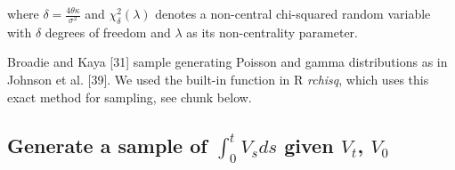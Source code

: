 \documentclass[12pt,twoside]{reedthesis}
\theoremstyle{definition}
\theoremstyle{definition}
\theoremstyle{remark}
\begin{document}
  where \(\delta = \frac{4 \theta \kappa}{\sigma^2}\) and
  \(\chi_{\delta}^{2}(\lambda)\) denotes a non-central chi-squared random
  variable with \(\delta\) degrees of freedom and \(\lambda\) as its
  non-centrality parameter.
  
  Broadie and Kaya {[}31{]} sample generating Poisson and gamma
  distributions as in Johnson et al. {[}39{]}. We used the built-in
  function in R \emph{rchisq}, which uses this exact method for sampling,
  see chunk below.
  \begin{Shaded}
  \begin{Highlighting}[]
  \StringTok{ }\NormalTok{(} \OperatorTok{*}\StringTok{ }\OperatorTok{*}\StringTok{ }\OperatorTok{/}\OperatorTok{^}
  \StringTok{ }\OperatorTok{^} \OperatorTok{*}\StringTok{ }\NormalTok{(} \OperatorTok{-}\StringTok{ }\NormalTok{(}\OperatorTok{-}\OperatorTok{*}\OperatorTok{/}\NormalTok{(}\OperatorTok{*}
  \StringTok{ }\OperatorTok{-}
  
  \StringTok{ }\NormalTok{(}\OperatorTok{*}\OperatorTok{*}\NormalTok{(}\OperatorTok{-}\OperatorTok{*}\OperatorTok{*}\OperatorTok{/}\OperatorTok{^} \OperatorTok{*}\StringTok{ }\NormalTok{(}\OperatorTok{-}\NormalTok{(}\OperatorTok{-}\OperatorTok{*}
  \StringTok{ }\OperatorTok{*}\StringTok{ }\OperatorTok{::}\NormalTok{(} \NormalTok{, }
  \end{Highlighting}
  \end{Shaded}
  \subsection{\texorpdfstring{Generate a sample of \(\int_0^t V_sds\)
  given \(V_t\),
  \(V_0\)}{Generate a sample of \textbackslash{}int\_0\^{}t V\_sds given V\_t, V\_0}}\label{generate-a-sample-of-int_0t-v_sds-given-v_t-v_0}
  
\end{document}
